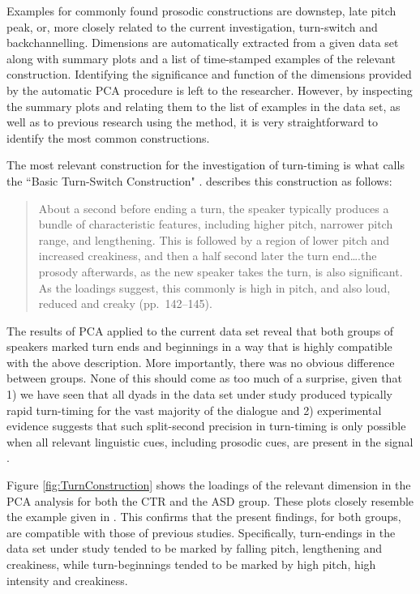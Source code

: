 Examples for commonly found prosodic constructions are downstep, late pitch peak, or, more closely related to the current investigation, turn-switch and back\-chan\-nelling. Dimensions are automatically extracted from a given data set along with summary plots and a list of time-stamped examples of the relevant construction. Identifying the significance and function of the dimensions provided by the automatic PCA procedure is left to the researcher. However, by inspecting the summary plots and relating them to the list of examples in the data set, as well as to previous research using the method, it is very straightforward to identify the most common constructions.

The most relevant construction for the investigation of turn-timing is what \citet{wardProsodicPatternsEnglish2019} calls the ``Basic Turn-Switch Construction" \citep[also discussed in][]{wardNonnativeDifferencesProsodicconstruction2017}. \citet{wardProsodicPatternsEnglish2019} describes this construction as follows:

\begin{quote}
About a second before ending a turn, the speaker typically produces a bundle of characteristic features, including higher pitch, narrower pitch range, and lengthening. This is followed by a region of lower pitch and increased creakiness, and then a half second later the turn end\ldots.the prosody afterwards, as the new speaker takes the turn, is also significant. As the loadings suggest, this commonly is high in pitch, and also loud, reduced and creaky (pp.~142--145).
\end{quote}

The results of PCA applied to the current data set reveal that both groups of speakers marked turn ends and beginnings in a way that is highly compatible with the above description. More importantly, there was no obvious difference between groups. None of this should come as too much of a surprise, given that 1) we have seen that all dyads in the data set under study produced typically rapid turn-timing for the vast majority of the dialogue and 2) experimental evidence suggests that such split-second precision in turn-timing is only possible when all relevant linguistic cues, including prosodic cues, are present in the signal \citep{barthelNextSpeakersPlan2017,barthelTimingUtterancePlanning2016,bogelsBrainResponseInsights2017,bogelsListenersUseIntonational2015,torreiraVocalReactionTimes2022}.

Figure \ref{fig:TurnConstruction} shows the loadings of the relevant dimension in the PCA analysis for both the CTR and the ASD group. These plots closely resemble the example given in \citet[p. 143]{wardProsodicPatternsEnglish2019}. This confirms that the present findings, for both groups, are compatible with those of previous studies. Specifically, turn-endings in the data set under study tended to be marked by falling pitch, lengthening and creakiness, while turn-beginnings tended to be marked by high pitch, high intensity and creakiness.

